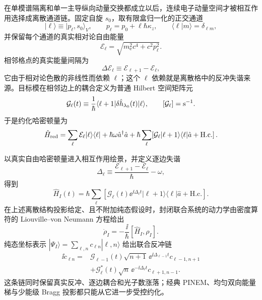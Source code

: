 在单模谱隔离和单一主导纵向动量交换都成立以后，连续电子动量空间才被相互作用选择成离散通道链。固定自旋 $s_0$，取有限盒归一化的正交通道
\begin{equation*}
|\ell\rangle\equiv|p_\ell,s_0\rangle_V,
\qquad
p_\ell=p_0+\ell\hbar \kappa_z,
\qquad
\langle\ell|m\rangle=\delta_{\ell m},
\end{equation*}
并保留每个通道的真实相对论自由能量
\begin{equation*}
{\mathcal E_\ell=\sqrt{m_{\mathrm e}^2c^4+c^2p_\ell^2}.}
\end{equation*}
相邻格点的真实能量间隔为
\[
 \Delta\mathcal E_\ell
 \equiv\mathcal E_{\ell+1}-\mathcal E_\ell,
\]
它由于相对论色散的非线性而依赖 $\ell$；这个 $\ell$ 依赖就是离散格中的反冲失谐来源。目标模在相邻边上的耦合定义为普通 Hilbert 空间矩阵元
\begin{equation}
{
\mathcal G_\ell(t)
\equiv\frac1\hbar\langle\ell+1|\delta\hat h_{\lambda_0}(t)|\ell\rangle,
\qquad [\mathcal G_\ell]={\rm s^{-1}}.}
\label{eq:normalized_discrete_channel_coupling}
\end{equation}
于是约化哈密顿量为
\begin{equation*}
\hat H_{\rm red}
=\sum_\ell\mathcal E_\ell|\ell\rangle\langle\ell|
+\hbar\omega\hat a^\dagger\hat a
+\hbar\sum_\ell\!
\left[\mathcal G_\ell|\ell+1\rangle\langle\ell|\hat a+\mathrm{H.c.}\right].
\end{equation*}

以真实自由哈密顿量进入相互作用绘景，并定义逐边失谐
\begin{equation*}
{
\Delta_\ell
\equiv\frac{\mathcal E_{\ell+1}-\mathcal E_\ell}{\hbar}-\omega,}
\end{equation*}
得到
\begin{equation*}
\hat H_I(t)=\hbar\sum_\ell
\left[
\mathcal G_\ell(t)\ee^{\ii\Delta_\ell t}|\ell+1\rangle\langle\ell|\hat a
+\mathrm{H.c.}
\right].
\end{equation*}
在上述离散结构投影给定、且不附加纯态假设时，封闭联合系统的动力学由密度算符的 Liouville--von Neumann 方程给出
\begin{equation}
{
\dot\rho_I=-\frac{\ii}{\hbar}[\hat H_I,\rho_I].}
\label{eq:unified_density_mother}
\end{equation}
纯态坐标表示 $|\Psi_I\rangle=\sum_{\ell,n}c_{\ell n}|\ell,n\rangle$ 给出联合反冲链
\begin{equation}
{
\begin{aligned}
\ii\dot c_{\ell n}
={}&\mathcal G_{\ell-1}(t)\sqrt{n+1}\,
\ee^{\ii\Delta_{\ell-1}t}c_{\ell-1,n+1}\\
&+\mathcal G_\ell^*(t)\sqrt n\,
\ee^{-\ii\Delta_\ell t}c_{\ell+1,n-1}.
\end{aligned}}
\label{eq:unified_joint_amplitude_chain}
\end{equation}
这条链同时保留真实反冲、逐边耦合和光子数涨落；经典 PINEM、均匀双向能量梯与少能级 Bragg 投影都只能从它进一步受控约化。

